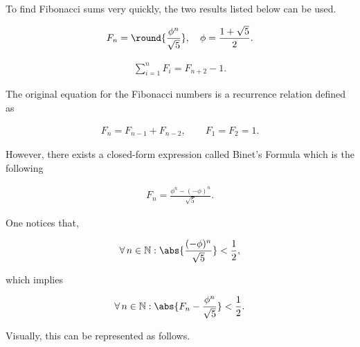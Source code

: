 \documentclass{uom-coursework}
\begin{document}
To find Fibonacci sums very quickly, the two results listed
below \cite{wikifib} can be used.

\begin{align}
  F_n = \round{\frac{\phi^n}{\sqrt{5}}}, \quad \phi = \frac{1 +
  \sqrt{5}}{2}. \label{fib_num}
\end{align}

\begin{align}
  \sum_{i=1}^{n} F_i = F_{n+2} - 1. \label{fib_sum}
\end{align}

The original equation for the Fibonacci numbers is a recurrence
relation defined as

\begin{align}
  F_n = F_{n-1} + F_{n-2}, \qquad F_1 = F_2 = 1. \label{fib_def}
\end{align}

However, there exists a closed-form expression called Binet's
Formula \cite{wolframfib} which is the following

\begin{align*}
  F_n = \frac{\phi^n - (-\phi)^n}{\sqrt{5}}.
\end{align*}

One notices that,

\begin{align*}
  \forall \, n \in \mathbb{N} : \abs{\frac{(-\phi)^n}{\sqrt{5}}}
  < \frac{1}{2},
\end{align*}

which implies

\begin{align*}
  \forall \, n \in \mathbb{N} : \abs{F_n -
  \frac{\phi^n}{\sqrt{5}}} < \frac{1}{2}.
\end{align*}

Visually, this can be represented as follows.

\begin{center}
\end{center}
\end{document}
